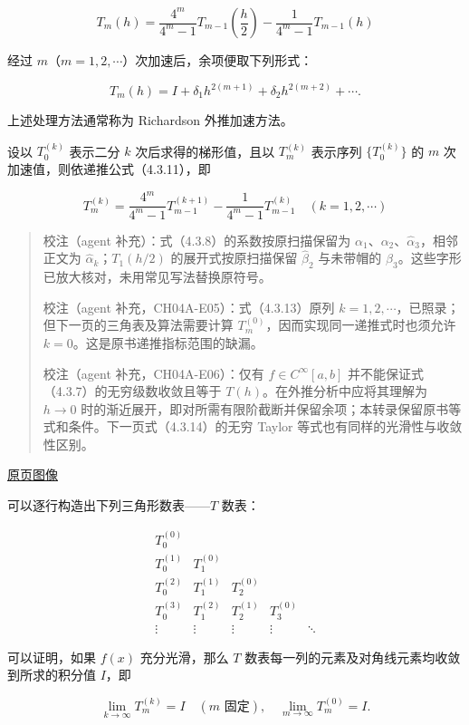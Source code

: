 \documentclass[
  10pt,
  fontset=fandol]{ctexart}
\begin{document}
\[
T_m(h)=\frac{4^m}{4^m-1}T_{m-1}\left(\frac h2\right)-\frac1{4^m-1}T_{m-1}(h)
\tag{4.3.11}
\]

经过 \(m\)（\(m=1,2,\cdots\)）次加速后，余项便取下列形式：

\[
T_m(h)=I+\delta_1h^{2(m+1)}+\delta_2h^{2(m+2)}+\cdots.
\tag{4.3.12}
\]

上述处理方法通常称为 Richardson 外推加速方法。

设以 \(T_0^{(k)}\) 表示二分 \(k\) 次后求得的梯形值，且以 \(T_m^{(k)}\) 表示序列 \(\{T_0^{(k)}\}\) 的 \(m\) 次加速值，则依递推公式（4.3.11），即

\[
T_m^{(k)}=\frac{4^m}{4^m-1}T_{m-1}^{(k+1)}-\frac1{4^m-1}T_{m-1}^{(k)}\quad(k=1,2,\cdots)
\tag{4.3.13}
\]

\begin{quote}
校注（agent 补充）：式（4.3.8）的系数按原扫描保留为 \(\alpha_1\)、\(\alpha_2\)、\(\hat\alpha_3\)，相邻正文为 \(\hat\alpha_k\)；\(T_1(h/2)\) 的展开式按原扫描保留 \(\hat\beta_2\) 与未带帽的 \(\beta_3\)。这些字形已放大核对，未用常见写法替换原符号。

校注（agent 补充，CH04A-E05）：式（4.3.13）原列 \(k=1,2,\cdots\)，已照录；但下一页的三角表及算法需要计算 \(T_m^{(0)}\)，因而实现同一递推式时也须允许 \(k=0\)。这是原书递推指标范围的缺漏。

校注（agent 补充，CH04A-E06）：仅有 \(f\in C^\infty[a,b]\) 并不能保证式（4.3.7）的无穷级数收敛且等于 \(T(h)\)。在外推分析中应将其理解为 \(h\to0\) 时的渐近展开，即对所需有限阶截断并保留余项；本转录保留原书等式和条件。下一页式（4.3.14）的无穷 Taylor 等式也有同样的光滑性与收敛性区别。
\end{quote}

\href{../../source-images/pdf-105.jpeg}{原页图像}

可以逐行构造出下列三角形数表------\(T\) 数表：

\[
\begin{array}{ccccc}
T_0^{(0)}&&&&\\
T_0^{(1)}&T_1^{(0)}&&&\\
T_0^{(2)}&T_1^{(1)}&T_2^{(0)}&&\\
T_0^{(3)}&T_1^{(2)}&T_2^{(1)}&T_3^{(0)}&\\
\vdots&\vdots&\vdots&\vdots&\ddots
\end{array}
\]

可以证明，如果 \(f(x)\) 充分光滑，那么 \(T\) 数表每一列的元素及对角线元素均收敛到所求的积分值 \(I\)，即

\[
\lim_{k\to\infty}T_m^{(k)}=I\quad(m\text{ 固定}),\quad\lim_{m\to\infty}T_m^{(0)}=I.
\]
\end{document}
